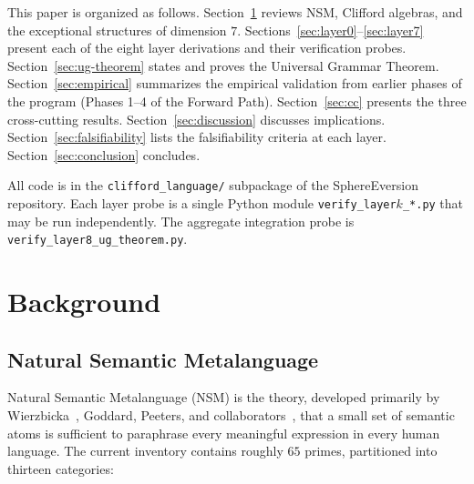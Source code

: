 \documentclass[11pt,a4paper]{article}
\theoremstyle{plain}
\theoremstyle{definition}
\theoremstyle{remark}
\numberwithin{equation}{section}
\begin{document}
This paper is organized as follows.
Section~\ref{sec:background} reviews NSM, Clifford algebras, and
the exceptional structures of dimension $7$.
Sections~\ref{sec:layer0}--\ref{sec:layer7} present each of the
eight layer derivations and their verification probes.
Section~\ref{sec:ug-theorem} states and proves the Universal
Grammar Theorem.  Section~\ref{sec:empirical} summarizes the
empirical validation from earlier phases of the program (Phases
1--4 of the Forward Path).  Section~\ref{sec:cc} presents the
three cross-cutting results.  Section~\ref{sec:discussion}
discusses implications.  Section~\ref{sec:falsifiability} lists
the falsifiability criteria at each layer.
Section~\ref{sec:conclusion} concludes.

All code is in the \texttt{clifford\_language/} subpackage of the
SphereEversion repository.  Each layer probe is a single Python
module \texttt{verify\_layer$k$\_*.py} that may be run
independently.  The aggregate integration probe is
\texttt{verify\_layer8\_ug\_theorem.py}.


\section{Background}\label{sec:background}

\subsection{Natural Semantic Metalanguage}\label{sec:bg-nsm}

Natural Semantic Metalanguage (NSM) is the theory, developed
primarily by Wierzbicka~\cite{wierzbicka1996}, Goddard, Peeters,
and collaborators~\cite{goddard2008,goddard2018}, that a small set
of semantic atoms is sufficient to paraphrase every meaningful
expression in every human language.  The current inventory contains
roughly $65$ primes, partitioned into thirteen categories:
\end{document}

